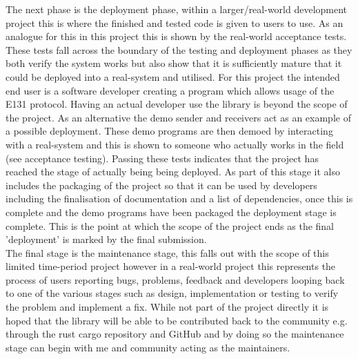 \documentclass[11pt,a4paper]{article}
\begin{document}
The next phase is the deployment phase, within a larger/real-world development project this is where the finished and tested code is given to users to use. As an analogue for this in this project this is shown by the real-world acceptance tests. These tests fall across the boundary of the testing and deployment phases as they both verify the system works but also show that it is sufficiently mature that it could be deployed into a real-system and utilised. For this project the intended end user is a software developer creating a program which allows usage of the E131 protocol. Having an actual developer use the library is beyond the scope of the project. As an alternative the demo sender and receivers act as an example of a possible deployment. These demo programs are then demoed by interacting with a real-system and this is shown to someone who actually works in the field (see acceptance testing). Passing these tests indicates that the project has reached the stage of actually being being deployed. As part of this stage it also includes the packaging of the project so that it can be used by developers including the finalisation of documentation and a list of dependencies, once this is complete and the demo programs have been packaged the deployment stage is complete. This is the point at which the scope of the project ends as the final 'deployment' is marked by the final submission.\\

The final stage is the maintenance stage, this falls out with the scope of this limited time-period project however in a real-world project this represents the process of users reporting bugs, problems, feedback and developers looping back to one of the various stages such as design, implementation or testing to verify the problem and implement a fix. While not part of the project directly it is hoped that the library will be able to be contributed back to the community e.g. through the rust cargo repository and GitHub and by doing so the maintenance stage can begin with me and community acting as the maintainers.\\
\end{document}
